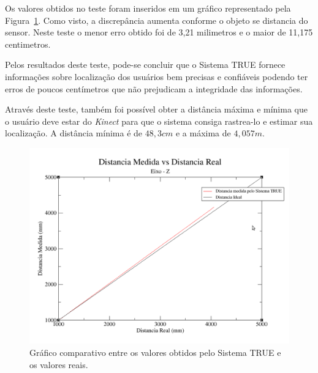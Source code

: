 	Os valores obtidos no teste foram inseridos em um gráfico representado pela Figura~\ref{fig:grafico-z}. Como visto, a discrepância aumenta conforme o objeto se distancia do sensor. Neste teste o menor erro obtido foi de 3,21 milimetros e o maior de 11,175 centimetros. 
	

	Pelos resultados deste teste, pode-se concluir que o Sistema TRUE fornece informações sobre localização dos usuários bem precisas e confiáveis podendo ter erros de poucos centímetros que não prejudicam a integridade das informações. 

	Através deste teste, também foi possível obter a distância máxima e mínima que o usuário deve estar do \textit{Kinect} para que o sistema consiga rastrea-lo e estimar sua localização. A distância mínima é de $\displaystyle 48,3 cm$ e a máxima de $\displaystyle 4,057 m$.

	\begin{figure}[H]
		\begin{center}
			\includegraphics[scale=0.4]{figuras/5.Testes/grafico-eixo-z.png}
		\end{center}
		\caption{Gráfico comparativo entre os valores obtidos pelo Sistema TRUE e os valores reais.}
		\label{fig:grafico-z}
	\end{figure}


